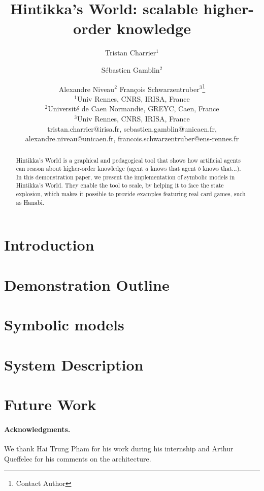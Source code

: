 \documentclass{article}
\title{Hintikka's World: scalable higher-order knowledge}
\author{
Tristan Charrier$^1$\and
Sébastien Gamblin$^2$\and
Alexandre Niveau$^{2}$\And
François Schwarzentruber$^3$\footnote{Contact Author}\\
\affiliations
$^1$Univ Rennes, CNRS, IRISA, France\\
$^2$Université de Caen Normandie, GREYC, Caen, France\\
$^3$Univ Rennes, CNRS, IRISA, France\\
\emails
tristan.charrier@irisa.fr, 
sebastien.gamblin@unicaen.fr,
alexandre.niveau@unicaen.fr,
francois.schwarzentruber@ens-rennes.fr
}
\begin{document}
\newcommand{\mettel}{\textsf{MetTeL2}\xspace}
\newcommand{\citet}[1]{\citeauthor{#1}~\shortcite{#1}}

\maketitle

\begin{abstract}
	Hintikka's World is a graphical and pedagogical tool that shows how artificial agents can reason about higher-order knowledge (agent $a$ knows that agent $b$ knows that...).
	In this demonstration paper, we present the implementation of symbolic models in Hintikka's World. They enable the tool to scale, by helping it to face the state explosion, which makes it possible to provide examples featuring real card games, such as Hanabi.
\end{abstract}



\section{Introduction}


\section{Demonstration Outline}
\label{section:demonstration}



\section{Symbolic models}
\label{section:symbolicmodels}








\section{System Description}
\label{section:architecture}


\section{Future Work}
\label{section:perspectives}


\paragraph{Acknowledgments. }
%
We thank Hai Trung Pham for his work during his internship and Arthur Queffelec for his comments on the architecture.








\newpage





\end{document}

